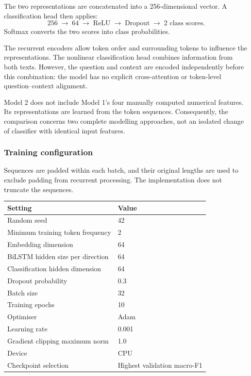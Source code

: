 \documentclass[11pt,a4paper]{article}
\begin{document}
The two representations are concatenated into a 256-dimensional vector.
A classification head then applies:
\[
256
\;\longrightarrow\;
64
\;\longrightarrow\;
\text{ReLU}
\;\longrightarrow\;
\text{Dropout}
\;\longrightarrow\;
2\text{ class scores}.
\]
Softmax converts the two scores into class probabilities.

The recurrent encoders allow token order and surrounding tokens to
influence the representations. The nonlinear classification head
combines information from both texts. However, the question and context
are encoded independently before this combination: the model has no
explicit cross-attention or token-level question--context alignment.

Model 2 does not include Model 1's four manually computed numerical
features. Its representations are learned from the token sequences.
Consequently, the comparison concerns two complete modelling approaches,
not an isolated change of classifier with identical input features.

\subsubsection{Training configuration}

Sequences are padded within each batch, and their original lengths are
used to exclude padding from recurrent processing. The implementation
does not truncate the sequences.

\begin{center}
\begin{tabular}{ll}
\toprule
Setting & Value \\
\midrule
Random seed & 42 \\
Minimum training token frequency & 2 \\
Embedding dimension & 64 \\
BiLSTM hidden size per direction & 64 \\
Classification hidden dimension & 64 \\
Dropout probability & 0.3 \\
Batch size & 32 \\
Training epochs & 10 \\
Optimiser & Adam \\
Learning rate & 0.001 \\
Gradient clipping maximum norm & 1.0 \\
Device & CPU \\
Checkpoint selection & Highest validation macro-F1 \\
\bottomrule
\end{tabular}
\end{center}
\end{document}
